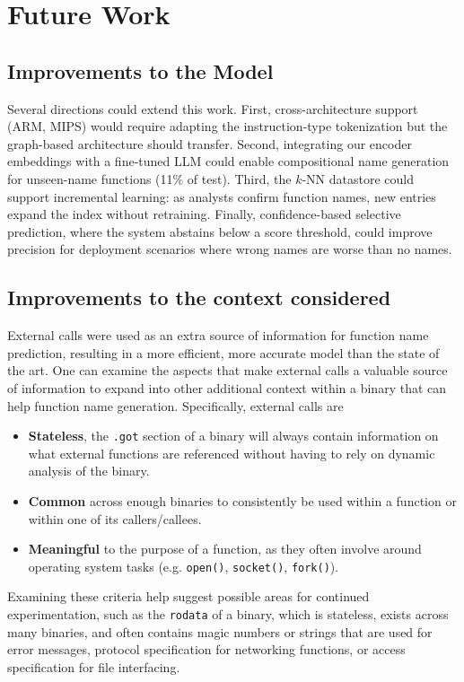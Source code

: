 \documentclass[sigconf,nonacm]{acmart}
\begin{document}
\section{Future Work}
\label{sec:future}

\subsection{Improvements to the Model}
Several directions could extend this work. First, cross-architecture support (ARM, MIPS) would require adapting the instruction-type tokenization but the graph-based architecture should transfer. Second, integrating our encoder embeddings with a fine-tuned LLM could enable compositional name generation for unseen-name functions (11\% of test). Third, the $k$-NN datastore could support incremental learning: as analysts confirm function names, new entries expand the index without retraining. Finally, confidence-based selective prediction, where the system abstains below a score threshold, could improve precision for deployment scenarios where wrong names are worse than no names.

\subsection{Improvements to the context considered}
External calls were used as an extra source of information for function name prediction, resulting in a more efficient, more accurate model than the state of the art. One can examine the aspects that make external calls a valuable source of information to expand into other additional context within a binary that can help function name generation. Specifically, external calls are
\begin{itemize}
    \item \textbf{Stateless}, the \texttt{.got} section of a binary will always contain information on what external functions are referenced without having to rely on dynamic analysis of the binary.
    \item \textbf{Common} across enough binaries to consistently be used within a function or within one of its callers/callees.
    \item \textbf{Meaningful} to the purpose of a function, as they often involve around operating system tasks (e.g. \texttt{open()}, \texttt{socket()}, \texttt{fork()}).
\end{itemize} 
Examining these criteria help suggest possible areas for continued experimentation, such as the \texttt{rodata} of a binary, which is stateless, exists across many binaries, and often contains magic numbers or strings that are used for error messages, protocol specification for networking functions, or access specification for file interfacing. 
\end{document}
